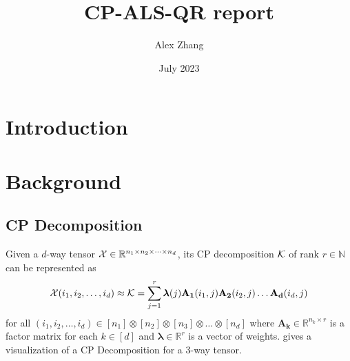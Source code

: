 \documentclass{article}
\title{CP-ALS-QR report}
\author{Alex Zhang}
\date{July 2023}
\newcommand{\mat}[1]{\mathbf{#1}}
\newcommand{\V}[2][]{\bm{#1{\mathbf{\MakeLowercase{#2}}}}} 		%
\newcommand{\T}[2][]{#1{\mathbf{\cal{#2}}}} 						%
\begin{document}
\maketitle
\section{Introduction}





\section{Background}
\subsection{CP Decomposition}
Given a $d$-way tensor $\T{X} \in \mathbb{R}^{n_1\times n_2\times \dots \times n_d}$, its
CP decomposition $\T{K}$ of rank $r \in \mathbb{N}$ can be represented as 
\begin{equation}
\label{eq:CP}
\T{X}(i_1,i_2,\dots, i_d) \approx \T{K} = \sum^{r}_{j=1} \V{\lambda}(j) \mat{A_1}(i_1,j)\mat{A_2}(i_2,j) \dots \mat{A_d}(i_d,j)
\end{equation}
for all $(i_1,i_2,\dots, i_d) \in [n_1] \otimes [n_2] \otimes [n_3] \otimes \dots \otimes [n_d]$ where $\mat{A_k} \in \mathbb{R}^{n_k \times r}$ is a factor matrix for each $k \in [d]$ and $\bm{\lambda}\in\mathbb{R}^r$ is a vector of weights. 
 gives a visualization of a CP Decomposition for a 3-way tensor.
\end{document}
